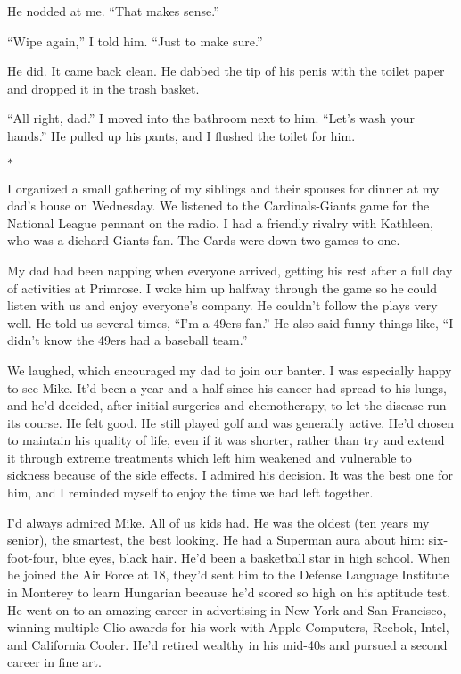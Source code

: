 \documentclass[12pt]{book}
\begin{document}
He nodded at me. ``That makes sense.''

``Wipe again,'' I told him. ``Just to make sure.''

He did. It came back clean. He dabbed the tip of his penis with the toilet paper and dropped it in the trash basket.

``All right, dad.'' I moved into the bathroom next to him. ``Let's wash your hands.'' He pulled up his pants, and I flushed the toilet for him.

\begin{center}$*$\end{center}

I organized a small gathering of my siblings and their spouses for dinner at my dad's house on Wednesday. We listened to the Cardinals-Giants game for the National League pennant on the radio. I had a friendly rivalry with Kathleen, who was a diehard Giants fan. The Cards were down two games to one.

My dad had been napping when everyone arrived, getting his rest after a full day of activities at Primrose. I woke him up halfway through the game so he could listen with us and enjoy everyone's company. He couldn't follow the plays very well. He told us several times, ``I'm a 49ers fan.'' He also said funny things like, ``I didn't know the 49ers had a baseball team.''

We laughed, which encouraged my dad to join our banter. I was especially happy to see Mike. It'd been a year and a half since his cancer had spread to his lungs, and he'd decided, after initial surgeries and chemotherapy, to let the disease run its course. He felt good. He still played golf and was generally active. He'd chosen to maintain his quality of life, even if it was shorter, rather than try and extend it through extreme treatments which left him weakened and vulnerable to sickness because of the side effects. I admired his decision. It was the best one for him, and I reminded myself to enjoy the time we had left together.

I'd always admired Mike. All of us kids had. He was the oldest (ten years my senior), the smartest, the best looking. He had a Superman aura about him: six-foot-four, blue eyes, black hair. He'd been a basketball star in high school. When he joined the Air Force at 18, they'd sent him to the Defense Language Institute in Monterey to learn Hungarian because he'd scored so high on his aptitude test. He went on to an amazing career in advertising in New York and San Francisco, winning multiple Clio awards for his work with Apple Computers, Reebok, Intel, and California Cooler. He'd retired wealthy in his mid-40s and pursued a second career in fine art.
\end{document}
